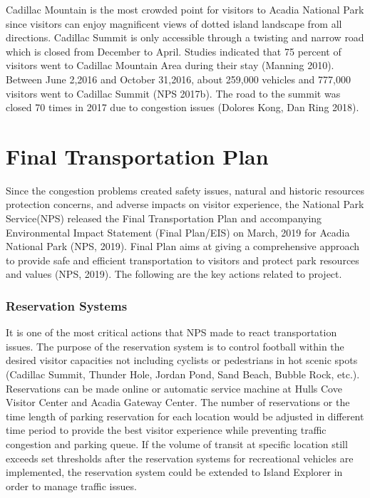 \par Cadillac Mountain is the most crowded point for visitors to Acadia National Park since visitors can enjoy magnificent views of dotted island landscape from all directions. Cadillac Summit is only accessible through a twisting and narrow road which is closed from December to April. Studies indicated that 75 percent of visitors went to Cadillac Mountain Area during their stay (Manning 2010). Between June 2,2016 and October 31,2016, about 259,000 vehicles and 777,000 visitors went to Cadillac Summit (NPS 2017b). The road to the summit was closed 70 times in 2017 due to congestion issues (Dolores Kong, Dan Ring 2018). 

\section{Final Transportation Plan}
\par Since the congestion problems created safety issues, natural and historic resources protection concerns, and adverse impacts on visitor experience, the National Park Service(NPS) released the Final Transportation Plan and accompanying Environmental Impact Statement (Final Plan/EIS) on March, 2019 for Acadia National Park (NPS, 2019). Final Plan aims at giving a comprehensive approach to provide safe and efficient transportation to visitors and protect park resources and values (NPS, 2019). The following are the key actions related to project. 

\subsubsection*{Reservation Systems}
\par It is one of the most critical actions that NPS made to react transportation issues. The purpose of the reservation system is to control football within the desired visitor capacities not including cyclists or pedestrians in hot scenic spots (Cadillac Summit, Thunder Hole, Jordan Pond, Sand Beach, Bubble Rock, etc.). Reservations can be made online or automatic service machine at Hulls Cove Visitor Center and Acadia Gateway Center. The number of reservations or the time length of parking reservation for each location would be adjusted in different time period to provide the best visitor experience while preventing traffic congestion and parking queue. If the volume of transit at specific location still exceeds set thresholds after the reservation systems for recreational vehicles are implemented, the reservation system could be extended to Island Explorer in order to manage traffic issues. 


